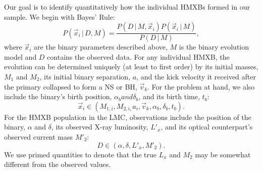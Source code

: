 \documentclass[12pt, preprint]{aastex}
\newcommand{\given}{\,|\,}
\begin{document}
Our goal is to identify quantitatively how the individual HMXBs formed in our sample. We begin with Bayes' Rule:
\begin{equation}
P( \vec{x}_i \given D, M ) = \frac{P( D \given M, \vec{x}_i ) P(\vec{x}_i \given M)}{P(D \given M)},
\end{equation}
where $\vec{x}_i$ are the binary parameters described above, $M$ is the binary evolution model and $D$ contains the observed data. For any individual HMXB, the evolution can be determined uniquely (at least to first order) by its initial masses, $M_1$ and $M_2$, its initial binary separation, $a$, and the kick velocity it received after the primary collapsed to form a NS or BH, $\vec{v}_k$. For the problem at hand, we also include the binary's birth position, $\alpha_b and \delta_b$, and its birth time, $t_b$:
\begin{equation}
\vec{x}_i \in (M_{1,i}, M_{2,i,} a_i, \vec{v}_k, \alpha_b, \delta_b, t_b). \label{eq:x_i}
\end{equation}
For the HMXB population in the LMC, observations include the position of the binary, $\alpha$ and $\delta$, its observed X-ray luminosity, $L'_x$, and its optical counterpart's observed current mass $M'_2$:
\begin{equation}
D \in (\alpha, \delta, L'_x, M'_2). \label{eq:D}
\end{equation}
We use primed quantities to denote that the true $L_x$ and $M_2$ may be somewhat different from the observed values. 
\end{document}
